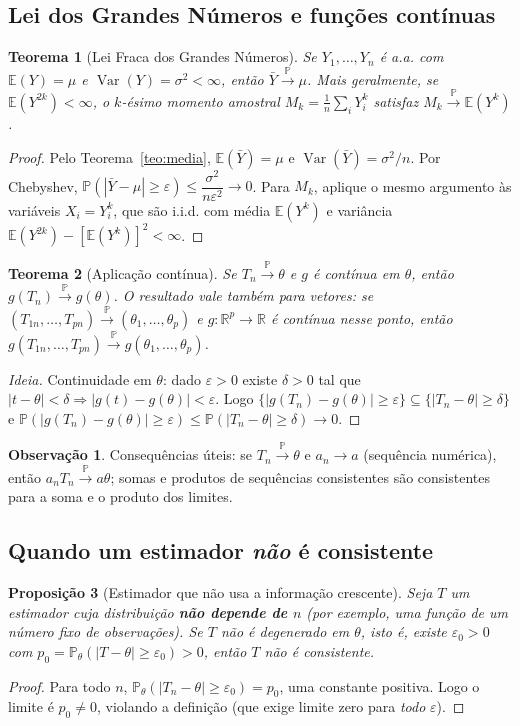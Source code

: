 \documentclass[11pt,a4paper]{article}
\theoremstyle{definition}
\newtheorem{observacao}{Observação}[section]
\theoremstyle{plain}
\newtheorem{teorema}{Teorema}[section]
\newtheorem{proposicao}[teorema]{Proposição}
\newcommand{\E}{\mathbb{E}}
\newcommand{\Var}{\operatorname{Var}}
\newcommand{\Prob}{\mathbb{P}}
\newcommand{\R}{\mathbb{R}}
\newcommand{\convP}{\xrightarrow{\;\Prob\;}}
\newcommand{\bY}{\bar{Y}}
\begin{document}
\subsection{Lei dos Grandes Números e funções contínuas}

\begin{teorema}[Lei Fraca dos Grandes Números]\label{teo:lgn}
Se $Y_1,\dots,Y_n$ é a.a. com $\E(Y)=\mu$ e $\Var(Y)=\sigma^2<\infty$, então $\bY\convP\mu$. Mais geralmente, se $\E(Y^{2k})<\infty$, o $k$-ésimo momento amostral $M_k=\frac1n\sum_i Y_i^k$ satisfaz $M_k\convP\E(Y^k)$.
\end{teorema}
\begin{proof}
Pelo Teorema~\ref{teo:media}, $\E(\bY)=\mu$ e $\Var(\bY)=\sigma^2/n$. Por Chebyshev,
$\Prob(|\bY-\mu|\ge\varepsilon)\le\dfrac{\sigma^2}{n\varepsilon^2}\to 0$.
Para $M_k$, aplique o mesmo argumento às variáveis $X_i=Y_i^k$, que são i.i.d. com média $\E(Y^k)$ e variância $\E(Y^{2k})-[\E(Y^k)]^2<\infty$.
\end{proof}

\begin{teorema}[Aplicação contínua]\label{teo:cont}
Se $T_n\convP\theta$ e $g$ é contínua em $\theta$, então $g(T_n)\convP g(\theta)$. O resultado vale também para vetores: se $(T_{1n},\dots,T_{pn})\convP(\theta_1,\dots,\theta_p)$ e $g:\R^p\to\R$ é contínua nesse ponto, então $g(T_{1n},\dots,T_{pn})\convP g(\theta_1,\dots,\theta_p)$.
\end{teorema}
\begin{proof}[Ideia]
Continuidade em $\theta$: dado $\varepsilon>0$ existe $\delta>0$ tal que $|t-\theta|<\delta\Rightarrow|g(t)-g(\theta)|<\varepsilon$. Logo
$\{|g(T_n)-g(\theta)|\ge\varepsilon\}\subseteq\{|T_n-\theta|\ge\delta\}$ e
$\Prob(|g(T_n)-g(\theta)|\ge\varepsilon)\le\Prob(|T_n-\theta|\ge\delta)\to 0$.
\end{proof}

\begin{observacao}
Consequências úteis: se $T_n\convP\theta$ e $a_n\to a$ (sequência numérica), então $a_nT_n\convP a\theta$; somas e produtos de sequências consistentes são consistentes para a soma e o produto dos limites.
\end{observacao}

\subsection{Quando um estimador \emph{não} é consistente}

\begin{proposicao}[Estimador que não usa a informação crescente]\label{prop:naocons}
Seja $T$ um estimador cuja distribuição \textbf{não depende de $n$} (por exemplo, uma função de um número fixo de observações). Se $T$ não é degenerado em $\theta$, isto é, existe $\varepsilon_0>0$ com $p_0=\Prob_\theta(|T-\theta|\ge\varepsilon_0)>0$, então $T$ não é consistente.
\end{proposicao}
\begin{proof}
Para todo $n$, $\Prob_\theta(|T_n-\theta|\ge\varepsilon_0)=p_0$, uma constante positiva. Logo o limite é $p_0\neq 0$, violando a definição (que exige limite zero para \emph{todo} $\varepsilon$).
\end{proof}
\end{document}
